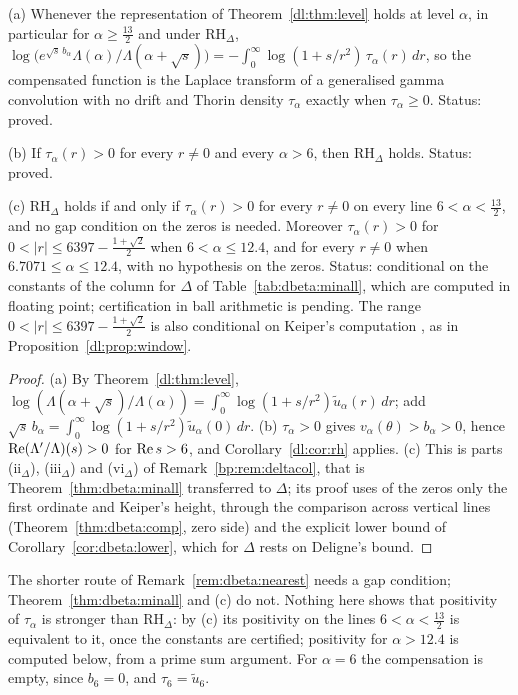 \begin{proposition}\label{dl:prop:minorigin}
(a) Whenever the representation of Theorem~\ref{dl:thm:level} holds at level $\alpha$, in particular for $\alpha\ge\frac{13}2$ and under $\mathrm{RH}_\Delta$, $\log\big(e^{\sqrt s\,b_\alpha}\Lambda(\alpha)/\Lambda(\alpha+\sqrt s)\big)=-\int_0^\infty\log(1+s/r^2)\,\tau_\alpha(r)\,dr$, so the compensated function is the Laplace transform of a generalised gamma convolution with no drift and Thorin density $\tau_\alpha$ exactly when $\tau_\alpha\ge0$. Status: proved.

(b) If $\tau_\alpha(r)>0$ for every $r\ne0$ and every $\alpha>6$, then $\mathrm{RH}_\Delta$ holds. Status: proved.

(c) $\mathrm{RH}_\Delta$ holds if and only if $\tau_\alpha(r)>0$ for every $r\ne0$ on every line $6<\alpha<\frac{13}2$, and no gap condition on the zeros is needed. Moreover $\tau_\alpha(r)>0$ for $0<|r|\le6397-\frac{1+\sqrt2}2$ when $6<\alpha\le12.4$, and for every $r\ne0$ when $6.7071\le\alpha\le12.4$, with no hypothesis on the zeros. Status: conditional on the constants of the column for $\Delta$ of Table~\ref{tab:dbeta:minall}, which are computed in floating point; certification in ball arithmetic is pending. The range $0<|r|\le6397-\frac{1+\sqrt2}2$ is also conditional on Keiper's computation \cite{NCKeiper96}, as in Proposition~\ref{dl:prop:window}.
\end{proposition}

\begin{proof}
(a) By Theorem~\ref{dl:thm:level}, $\log(\Lambda(\alpha+\sqrt s)/\Lambda(\alpha))=\int_0^\infty\log(1+s/r^2)\tilde u_\alpha(r)\,dr$; add $\sqrt s\,b_\alpha=\int_0^\infty\log(1+s/r^2)\tilde u_\alpha(0)\,dr$. (b) $\tau_\alpha>0$ gives $v_\alpha(\theta)>b_\alpha>0$, hence $\operatorname{Re}(\Lambda'/\Lambda)(s)>0$ for $\operatorname{Re} s>6$, and Corollary~\ref{dl:cor:rh} applies. (c) This is parts (ii$_\Delta$), (iii$_\Delta$) and (vi$_\Delta$) of Remark~\ref{bp:rem:deltacol}, that is Theorem~\ref{thm:dbeta:minall} transferred to $\Delta$; its proof uses of the zeros only the first ordinate and Keiper's height, through the comparison across vertical lines (Theorem~\ref{thm:dbeta:comp}, zero side) and the explicit lower bound of Corollary~\ref{cor:dbeta:lower}, which for $\Delta$ rests on Deligne's bound.
\end{proof}

The shorter route of Remark~\ref{rem:dbeta:nearest} needs a gap condition; Theorem~\ref{thm:dbeta:minall} and (c) do not. Nothing here shows that positivity of $\tau_\alpha$ is stronger than $\mathrm{RH}_\Delta$: by (c) its positivity on the lines $6<\alpha<\frac{13}2$ is equivalent to it, once the constants are certified; positivity for $\alpha>12.4$ is computed below, from a prime sum argument. For $\alpha=6$ the compensation is empty, since $b_6=0$, and $\tau_6=\tilde u_6$.

